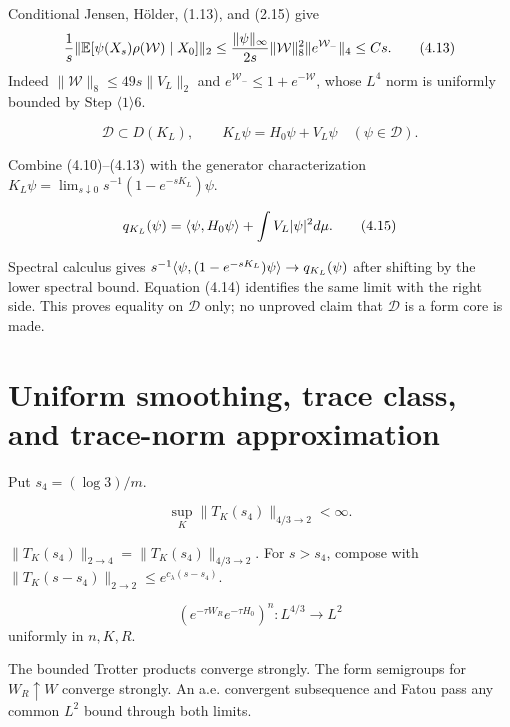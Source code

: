 \documentclass[11pt,a4paper]{article}
\newcommand{\D}{\mathcal D}
\begin{document}

\Because Conditional Jensen, H\"older, (1.13), and (2.15) give
\[
 \frac1s\|\mathbb E[\psi(X_s)\rho(\mathcal W)\mid X_0]\|_2
 \le\frac{\|\psi\|_\infty}{2s}
 \|\mathcal W\|_8^2\|e^{\mathcal W_-}\|_4
 \le Cs.
\tag{4.13}
\]
Indeed $\|\mathcal W\|_8\le49s\|V_L\|_2$ and
$e^{\mathcal W_-}\le1+e^{-\mathcal W}$, whose $L^4$ norm is uniformly
bounded by Step $\langle1\rangle6$.

\[
 \D\subset D(K_L),\qquad K_L\psi=H_0\psi+V_L\psi
 \quad(\psi\in\D).
\tag{4.14}
\]

\Because Combine (4.10)--(4.13) with the generator characterization
$K_L\psi=\lim_{s\downarrow0}s^{-1}(1-e^{-sK_L})\psi$.

\LS{2}{7}{For $\psi\in\D$,}
\[
 q_{K_L}(\psi)=\langle \psi,H_0\psi\rangle+\int V_L|\psi|^2d\mu.
\tag{4.15}
\]

\Because Spectral calculus gives
$s^{-1}\langle \psi,(1-e^{-sK_L})\psi\rangle\to q_{K_L}(\psi)$ after shifting by the
lower spectral bound.  Equation (4.14) identifies the same limit with the
right side.  This proves equality on $\D$ only; no unproved claim that $\D$ is a
form core is made.

\QedStep

\section{Uniform smoothing, trace class, and trace-norm approximation}


Put $s_4=(\log3)/m$.

\[
 \sup_K\|T_K(s_4)\|_{4/3\to2}<\infty.
\tag{5.1}
\]

\Because $\|T_K(s_4)\|_{2\to4}=\|T_K(s_4)\|_{4/3\to2}$.  For
$s>s_4$, compose with
$\|T_K(s-s_4)\|_{2\to2}\le e^{c_\lambda(s-s_4)}$.

\[
 (e^{-\tau W_R}e^{-\tau H_0})^n:L^{4/3}\to L^2
\tag{5.2}
\]
uniformly in $n,K,R$.

\Because The bounded Trotter products converge strongly.  The form semigroups for
$W_R\uparrow W$ converge strongly.  An a.e. convergent subsequence and Fatou pass
any common $L^2$ bound through both limits.
\end{document}
